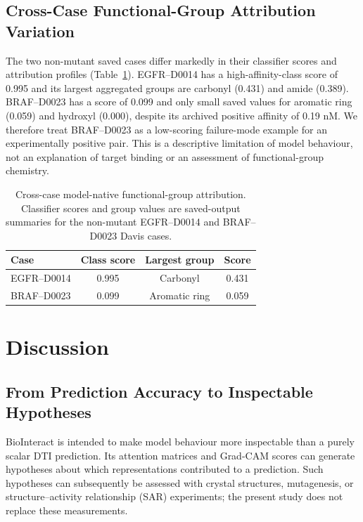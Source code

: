 \documentclass[fleqn,10pt]{wlscirep}
\begin{document}
\subsection{Cross-Case Functional-Group Attribution Variation}

The two non-mutant saved cases differ markedly in their classifier scores and
attribution profiles (Table~\ref{tab:functional_group_comparison}).  EGFR--D0014
has a high-affinity-class score of 0.995 and its largest aggregated groups are
carbonyl (0.431) and amide (0.389).  BRAF--D0023 has a score of 0.099 and only
small saved values for aromatic ring (0.059) and hydroxyl (0.000), despite its
archived positive affinity of 0.19 nM. We therefore treat BRAF--D0023 as a
low-scoring failure-mode example for an experimentally positive pair. This is a
descriptive limitation of model behaviour, not an explanation of target binding
or an assessment of functional-group chemistry.

\begin{table}[htbp]
\centering
\caption{Cross-case model-native functional-group attribution. Classifier
  scores and group values are saved-output summaries for the non-mutant
  EGFR--D0014 and BRAF--D0023 Davis cases.}
\label{tab:functional_group_comparison}
\begin{tabular}{lccc}
\toprule
\textbf{Case} & \textbf{Class score} & \textbf{Largest group} & \textbf{Score} \\
\midrule
EGFR--D0014 & 0.995 & Carbonyl & 0.431 \\
BRAF--D0023 & 0.099 & Aromatic ring & 0.059 \\
\bottomrule
\end{tabular}
\end{table}

\FloatBarrier

\section{Discussion}
\label{sec:discussion}

\subsection{From Prediction Accuracy to Inspectable Hypotheses}

BioInteract is intended to make model behaviour more inspectable than a purely
scalar DTI prediction.  Its attention matrices and Grad-CAM scores can generate
hypotheses about which representations contributed to a prediction.  Such
hypotheses can subsequently be assessed with crystal structures, mutagenesis,
or structure--activity relationship (SAR) experiments; the present study does
not replace these measurements.
\end{document}
